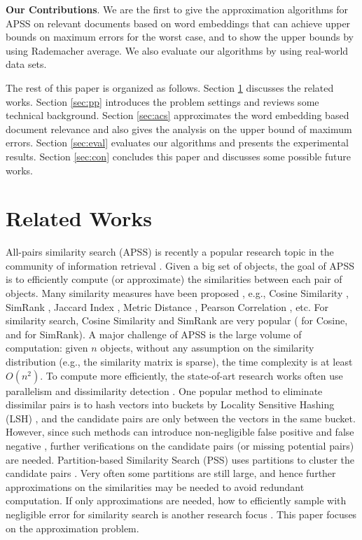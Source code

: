 \documentclass{article}
\begin{document}
{\color{black}
\textbf{Our Contributions}. We are the first to give the approximation algorithms for APSS on relevant documents based on word embeddings that can achieve upper bounds on maximum errors for the worst case, and to show the upper bounds by using Rademacher average. We also evaluate our algorithms by using real-world data sets.
}

The rest of this paper is organized as follows. Section \ref{sec:rw} discusses the related works. Section \ref{sec:pp} introduces the problem settings and reviews some technical background. Section \ref{sec:acs} approximates the word embedding based document relevance and also gives the analysis on the upper bound of maximum errors. Section \ref{sec:eval} evaluates our algorithms and presents the experimental results. Section \ref{sec:con} concludes this paper and discusses some possible future works.


\section{Related Works}
\label{sec:rw}
All-pairs similarity search (APSS) is recently a popular research topic in the community of information retrieval \cite{BMS07,Xia16,ATY13,TAJY14}. Given a big set of objects, the goal of APSS is to efficiently compute (or approximate) the similarities between each pair of objects. Many similarity measures have been proposed \cite{SGM00}, e.g., Cosine Similarity \cite{TP07}, SimRank \cite{JW02}, Jaccard Index \cite{HHH89}, Metric Distance \cite{SGM00}, Pearson Correlation \cite{BCY09}, etc. For similarity search, Cosine Similarity and SimRank are very popular (\cite{TP07,Xia16,ATY13,TAJY14} for Cosine, and \cite{LH10,FNS13,KMK14,YM15} for SimRank). A major challenge of APSS is the large volume of computation: given $n$ objects, without any assumption on the similarity distribution (e.g., the similarity matrix is sparse), the time complexity is at least $O(n^2)$. To compute more efficiently, the state-of-art research works often use parallelism \cite{CCK12,HFL10} and dissimilarity detection \cite{CL99,BKP15,LRU14,ATY13,TAJY14}. {\color{black} One popular method to eliminate dissimilar pairs is to hash vectors into buckets by Locality Sensitive Hashing (LSH) \cite{LRU14}, and the candidate pairs are only between the vectors in the same bucket. However, since such methods can introduce non-negligible false positive and false negative \cite{AMT13,TEL11}, further verifications on the candidate pairs (or missing potential pairs) are needed. Partition-based Similarity Search (PSS) uses partitions to cluster the candidate pairs \cite{TAJY14}. Very often some partitions are still large, and hence further approximations on the similarities may be needed to avoid redundant computation.} If only approximations are needed, how to efficiently sample with negligible error for similarity search is another research focus \cite{GIM99,FKS03,IM98,Char02}. This paper focuses on the approximation problem.
\end{document}
